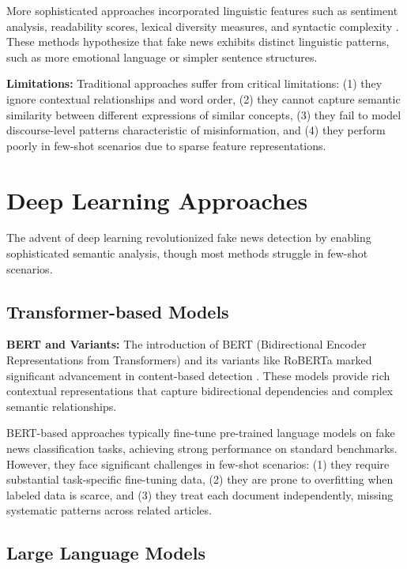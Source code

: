 More sophisticated approaches incorporated linguistic features such as sentiment analysis, readability scores, lexical diversity measures, and syntactic complexity \cite{horne2017just, rashkin2017truth}. These methods hypothesize that fake news exhibits distinct linguistic patterns, such as more emotional language or simpler sentence structures.

\textbf{Limitations:} Traditional approaches suffer from critical limitations: (1) they ignore contextual relationships and word order, (2) they cannot capture semantic similarity between different expressions of similar concepts, (3) they fail to model discourse-level patterns characteristic of misinformation, and (4) they perform poorly in few-shot scenarios due to sparse feature representations.

\section{Deep Learning Approaches}

The advent of deep learning revolutionized fake news detection by enabling sophisticated semantic analysis, though most methods struggle in few-shot scenarios.

\subsection{Transformer-based Models}

\textbf{BERT and Variants:} The introduction of BERT (Bidirectional Encoder Representations from Transformers) and its variants like RoBERTa marked significant advancement in content-based detection \cite{devlin2018bert, liu2019roberta, kaliyar2021fakebert}. These models provide rich contextual representations that capture bidirectional dependencies and complex semantic relationships.

BERT-based approaches typically fine-tune pre-trained language models on fake news classification tasks, achieving strong performance on standard benchmarks. However, they face significant challenges in few-shot scenarios: (1) they require substantial task-specific fine-tuning data, (2) they are prone to overfitting when labeled data is scarce, and (3) they treat each document independently, missing systematic patterns across related articles.

\subsection{Large Language Models}

